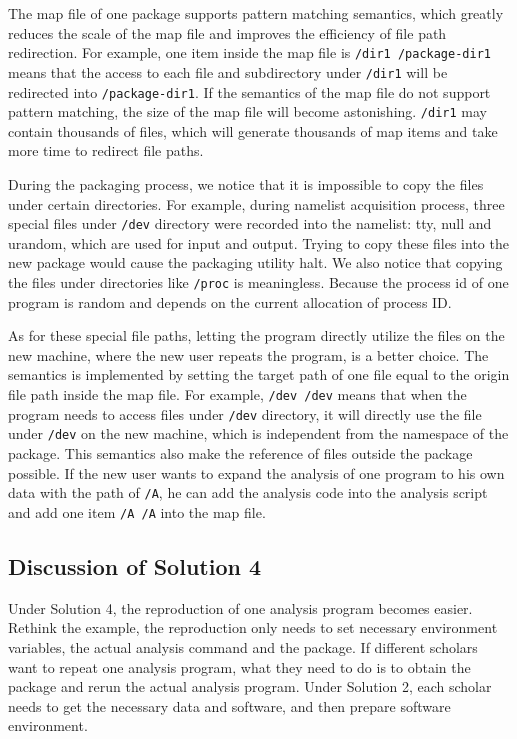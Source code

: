 \documentclass{acm_proc_article-sp}
\begin{document}
The map file of one package supports pattern matching semantics,
which greatly reduces the scale of the map file and improves the efficiency of file path redirection. 
For example,
one item inside the map file is {\tt /dir1 /package-dir1} means that the access to each file and
subdirectory under {\tt /dir1} will be redirected into {\tt /package-dir1}.
If the semantics of the map file do not support pattern matching, the size of the map file will become astonishing. 
{\tt /dir1} may contain thousands of files, which will generate thousands of map items and take more time to redirect file paths.

During the packaging process, we notice
that it is impossible to copy the files under certain directories.
For example, during namelist acquisition process, three special files under {\tt /dev} directory were recorded into the namelist: tty, null and urandom, which are used for input and output.
Trying to copy these files into the new package would cause the packaging utility halt.
We also notice that copying the files under directories like {\tt /proc} is
meaningless. Because the process id of one program is random and depends on the
current allocation of process ID. 

As for these special file paths, letting
the program directly utilize the files on the new machine, where the new user
repeats the program, is a better choice. The semantics is implemented by
setting the target path of one file equal to the origin file path inside the
map file. For example, {\tt /dev /dev} means that when the program needs to access
files under {\tt /dev} directory, it will directly use the file under {\tt /dev} on the new machine, which is
independent from the namespace of the package. This semantics also make the
reference of files outside the package possible. If the new user wants to
expand the analysis of one program to his own data with the path of {\tt /A}, he can add the analysis
code into the analysis script and add one item {\tt /A /A} into the map file.


\subsection{Discussion of Solution 4} 

Under Solution 4, the reproduction of one analysis program becomes easier.
Rethink the example, the reproduction only needs
to set necessary environment variables, the actual analysis command
and the package. If different scholars want to repeat one analysis program,
what they need to do is to obtain the package and rerun the actual analysis
program. Under Solution 2, each scholar needs to get the necessary data and
software, and then prepare software environment. 
\end{document}
